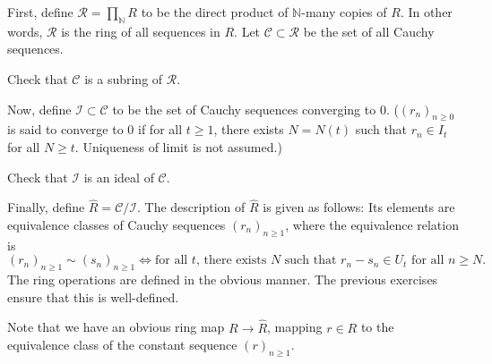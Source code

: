 \documentclass[12pt]{article}
\begin{document}
First, define $\mathcal{R} = \prod_{\mathbb{N}} R$ to be the direct product of $\mathbb{N}$-many copies of $R$. In other words, $\mathcal{R}$ is the ring of all sequences in $R$. \newline
Let $\mathcal{C} \subset \mathcal{R}$ be the set of all Cauchy sequences.

\begin{exe}
	Check that $\mathcal{C}$ is a subring of $\mathcal{R}$.
\end{exe}

Now, define $\mathcal{I} \subset \mathcal{C}$ to be the set of Cauchy sequences converging to $0$. ($(r_{n})_{n \ge 0}$ is said to converge to $0$ if for all $t \ge 1$, there exists $N = N(t)$ such that $r_{n} \in I_{t}$ for all $N \ge t$. Uniqueness of limit is not assumed.)

\begin{exe}
	Check that $\mathcal{I}$ is an ideal of $\mathcal{C}$.
\end{exe}

Finally, define $\widehat{R} = \mathcal{C}/\mathcal{I}$. The description of $\widehat{R}$ is given as follows: Its elements are equivalence classes of Cauchy sequences $(r_{n})_{n \ge 1}$, where the equivalence relation is
\begin{equation*} 
	(r_{n})_{n \ge 1} \sim (s_{n})_{n \ge 1} \Leftrightarrow \text{for all $t$, there exists $N$ such that $r_{n} - s_{n} \in U_{t}$ for all $n \ge N$}.
\end{equation*}
The ring operations are defined in the obvious manner. The previous exercises ensure that this is well-defined.

Note that we have an obvious ring map $R \to \widehat{R}$, mapping $r \in R$ to the equivalence class of the constant sequence $(r)_{n \ge 1}$.
\end{document}
